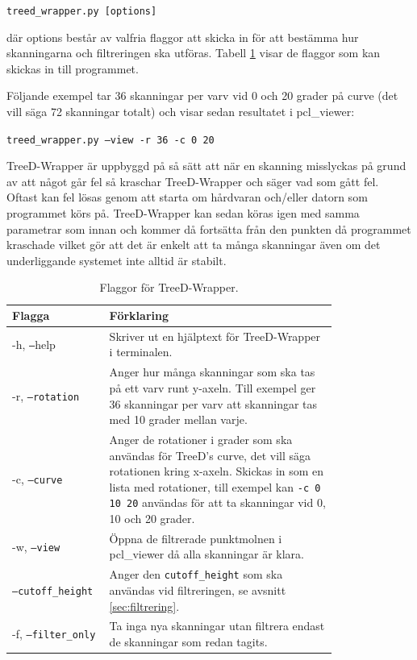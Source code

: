 \documentclass[a4paper,titlepage,12pt]{article}
\begin{document}
	\texttt{treed\_wrapper.py [options]}
	
	där options består av valfria flaggor att skicka in för att bestämma hur skanningarna och filtreringen ska utföras. Tabell \ref{tab:treedwrapper_flaggor} visar de flaggor som kan skickas in till programmet.
	
	Följande exempel tar 36 skanningar per varv vid 0 och 20 grader på curve (det vill säga 72 skanningar totalt) och visar sedan resultatet i pcl\_viewer:
	
	\texttt{treed\_wrapper.py --view -r 36 -c 0 20}
	
	TreeD-Wrapper är uppbyggd på så sätt att när en skanning misslyckas på grund av att något går fel så kraschar TreeD-Wrapper och säger vad som gått fel. Oftast kan fel lösas genom att starta om hårdvaran och/eller datorn som programmet körs på. TreeD-Wrapper kan sedan köras igen med samma parametrar som innan och kommer då fortsätta från den punkten då programmet kraschade vilket gör att det är enkelt att ta många skanningar även om det underliggande systemet inte alltid är stabilt.
		
	\begin{table}[H]
		\centering
		\caption{Flaggor för TreeD-Wrapper.}
		\label{tab:treedwrapper_flaggor}
		
		\begin{tabular}{p{0.2\linewidth}p{0.6\linewidth}}
			Flagga & Förklaring \\
			\hline
			-h, \texttt{--}help & Skriver ut en hjälptext för TreeD-Wrapper i terminalen. \\
			\hline
			-r, \texttt{--rotation} & Anger hur många skanningar som ska tas på ett varv runt y-axeln. Till exempel ger 36 skanningar per varv att skanningar tas med 10 grader mellan varje. \\
			\hline
			-c, \texttt{--curve} & Anger de rotationer i grader som ska användas för TreeD's curve, det vill säga rotationen kring x-axeln. Skickas in som en lista med rotationer, till exempel kan \texttt{-c 0 10 20} användas för att ta skanningar vid 0, 10 och 20 grader. \\
			\hline
			-w, \texttt{--view} & Öppna de filtrerade punktmolnen i pcl\_viewer då alla skanningar är klara. \\
			\hline
			\texttt{--cutoff\_height} & Anger den \texttt{cutoff\_height} som ska användas vid filtreringen, se avsnitt \ref{sec:filtrering}. \\
			\hline
			-f, \texttt{--filter\_only} & Ta inga nya skanningar utan filtrera endast de skanningar som redan tagits. \\
			\hline
		\end{tabular}
		
	\end{table}
	
\end{document}

